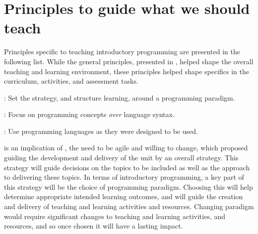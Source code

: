 








\clearpage
\section{Principles to guide what we should teach} %
\label{sec:principles_to_guide_what_we_should_cover}

Principles specific to teaching introductory programming are presented in the following list. While the general principles, presented in , helped shape the overall teaching and learning environment, these principles helped shape specifics in the curriculum, activities, and assessment tasks.

\begin{description}
	\item [\Pref{itm:paradigm}]: Set the strategy, and structure learning, around a programming paradigm.
	\item [\Pref{itm:concepts}]: Focus on programming concepts \emph{over} language syntax.
	\item [\Pref{itm:authentic}]: Use programming languages as they were designed to be used.
\end{description}

%

 is an implication of , the need to be agile and willing to change, which proposed guiding the development and delivery of the unit by an overall strategy. This strategy will guide decisions on the topics to be included as well as the approach to delivering these topics. In terms of introductory programming, a key part of this strategy will be the choice of programming paradigm. Choosing this will help determine appropriate intended learning outcomes, and will guide the creation and delivery of teaching and learning activities and resources. Changing paradigm would require significant changes to teaching and learning activities, and resources, and so once chosen it will have a lasting impact.

